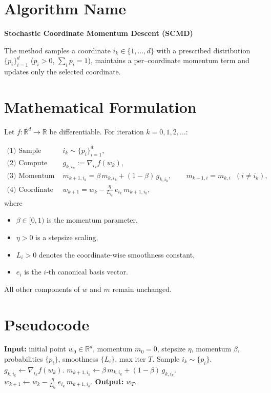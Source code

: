 \documentclass{article}
\newcommand{\R}{\mathbb{R}}
\begin{document}
\section*{Algorithm Name}
\textbf{Stochastic Coordinate Momentum Descent (SCMD)}  

The method samples a coordinate $i_k\in\{1,\dots,d\}$ with a prescribed
distribution $\{p_i\}_{i=1}^d$ ($p_i>0$, $\sum_i p_i =1$), maintains a
per–coordinate momentum term and updates only the selected coordinate.

\section*{Mathematical Formulation}
Let $f:\R^{d}\rightarrow\R$ be differentiable.
For iteration $k=0,1,2,\dots$:

\begin{align}
\text{(1)~Sample coordinate } & i_k\sim\{p_i\}_{i=1}^d,\\[4pt]
\text{(2)~Compute partial gradient } & g_{k,i_k}:=\nabla_{i_k}f(w_k),\\[4pt]
\text{(3)~Momentum update } &
m_{k+1,i_k}= \beta\, m_{k,i_k} + (1-\beta)\, g_{k,i_k},\qquad
m_{k+1,i}=m_{k,i}\;\;(i\neq i_k),\\[4pt]
\text{(4)~Coordinate step } &
w_{k+1}= w_k - \frac{\eta}{L_{i_k}}\, e_{i_k}\, m_{k+1,i_k},
\end{align}
where
\begin{itemize}[noitemsep]
\item $\beta\in[0,1)$ is the momentum parameter,
\item $\eta>0$ is a stepsize scaling,
\item $L_i>0$ denotes the coordinate‑wise smoothness constant,
\item $e_i$ is the $i$‑th canonical basis vector.
\end{itemize}
All other components of $w$ and $m$ remain unchanged.

\section*{Pseudocode}
\begin{algorithm}[H]
\caption{Stochastic Coordinate Momentum Descent}
\begin{algorithmic}[1]
\STATE \textbf{Input:} initial point $w_0\in\R^d$, momentum $m_0=0$, stepsize $\eta$, momentum $\beta$, probabilities $\{p_i\}$, smoothness $\{L_i\}$, max iter $T$.
    \STATE Sample $i_k\sim\{p_i\}$.
    \STATE $g_{k,i_k}\leftarrow \nabla_{i_k}f(w_k)$.
    \STATE $m_{k+1,i_k}\leftarrow \beta\,m_{k,i_k}+(1-\beta)\, g_{k,i_k}$.
    \STATE $w_{k+1}\leftarrow w_k-\frac{\eta}{L_{i_k}}\,e_{i_k}\,m_{k+1,i_k}$.
\ENDFOR
\STATE \textbf{Output:} $w_T$.
\end{algorithmic}
\end{algorithm}
\end{document}
